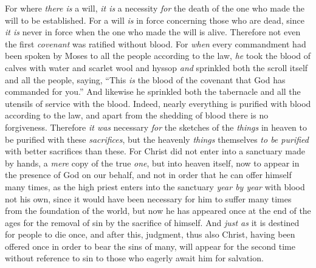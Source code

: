 \begin{biblechapter}
\verse For where \textit{there is} a will, \textit{it is} a necessity \textit{for} the death of the one who made the will to be established.
\verse For a will \textit{is} in force concerning those who are dead, since \textit{it is} never in force when the one who made the will is alive.
\verse Therefore not even the first \textit{covenant} was ratified without blood.
\verse For \textit{when} every commandment had been spoken by Moses to all the people according to the law, \textit{he} took the blood of calves with water and scarlet wool and hyssop \textit{and} sprinkled both the scroll itself and all the people,
\verse saying, “This \textit{is} the blood of the covenant that God has commanded for you.”
\verse And likewise he sprinkled both the tabernacle and all the utensils of service with the blood.
\verse Indeed, nearly everything is purified with blood according to the law, and apart from the shedding of blood there is no forgiveness.
\verse Therefore \textit{it was} necessary \textit{for} the sketches of the \textit{things} in heaven to be purified with these \textit{sacrifices}, but the heavenly \textit{things} themselves \textit{to be purified} with better sacrifices than these.
\verse For Christ did not enter into a sanctuary made by hands, a \textit{mere} copy of the true \textit{one}, but into heaven itself, now to appear in the presence of God on our behalf,
\verse and not in order that he can offer himself many times, as the high priest enters into the sanctuary \textit{year by year} with blood not his own,
\verse since it would have been necessary for him to suffer many times from the foundation of the world, but now he has appeared once at the end of the ages for the removal of sin by the sacrifice of himself.
\verse And \textit{just as} it is destined for people to die once, and after this, judgment,
\verse thus also Christ, having been offered once in order to bear the sins of many, will appear for the second time without reference to sin to those who eagerly await him for salvation.
\end{biblechapter}

